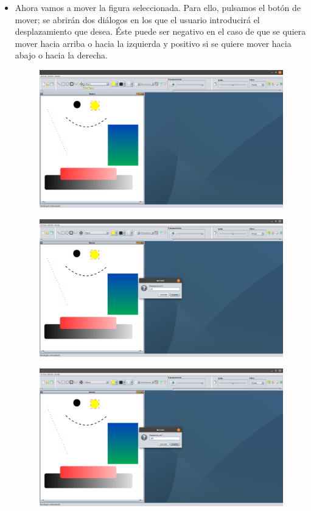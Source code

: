 \documentclass[11pt,a4paper]{article}
\begin{document}
\begin{itemize}
\begin{figure}[H]
	\end{figure}
	\item Ahora vamos a mover la figura seleccionada. Para ello, pulsamos el botón de mover; se abrirán dos diálogos en los que el usuario introducirá el desplazamiento que desea. Éste puede ser negativo en el caso de que se quiera mover hacia arriba o hacia la izquierda y positivo si se quiere mover hacia abajo o hacia la derecha.
	\begin{figure}[H]
	\centering
		\includegraphics[scale=0.2]{./img/6.png}
	\end{figure}
	\begin{figure}[H]
	\centering
		\includegraphics[scale=0.2]{./img/7.png}
	\end{figure}
	\begin{figure}[H]
	\centering
		\includegraphics[scale=0.2]{./img/8.png}

\end{figure}
\end{itemize}
\end{document}
